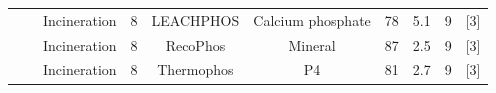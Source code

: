 \documentclass[authoryear]{elsarticle}
\begin{document}
\begin{table}[h]
{\begin{threeparttable}
\begin{tabular}{@{}cccccccccc@{}}
			&                                                                                                                                                         & Incineration                                                                     & 8                                      & LEACHPHOS                                                                                & Calcium phosphate                                                                 & 78                                                                                    & 5.1                                  & 9                                                            &     [3]     \\
			&                                                                                                                                                         & Incineration                                                                     & 8                                      & RecoPhos                                                                                 & Mineral                                                                           & 87                                                                                    & 2.5                                  & 9                                                            &      [3]    \\
			&                                                                                                                                                         & Incineration                                                                     & 8                                      & Thermophos                                                                               & P4                                                                                & 81                                                                                    & 2.7                                  & 9                                                            &    [3]      \\ \cmidrule(l){2-10}

\end{tabular}
\end{threeparttable}}
\end{table}
\end{document}
